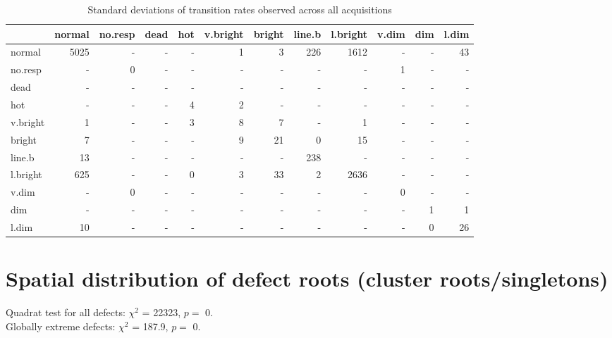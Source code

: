 \documentclass[10pt,fleqn]{article}\usepackage[]{graphicx}\usepackage[]{color}
\begin{document}
\begin{table}[!ht]
\caption{Standard deviations of transition rates observed across all acquisitions}
\begingroup\footnotesize
\begin{tabular}{l|rrrrrrrrrrr}
  \hline
 & normal & no.resp & dead & hot & v.bright & bright & line.b & l.bright & v.dim & dim & l.dim \\ 
  \hline
normal & 5025 & - & - & - & 1 & 3 & 226 & 1612 & - & - & 43 \\ 
  no.resp & - & 0 & - & - & - & - & - & - & 1 & - & - \\ 
  dead & - & - & - & - & - & - & - & - & - & - & - \\ 
  hot & - & - & - & 4 & 2 & - & - & - & - & - & - \\ 
  v.bright & 1 & - & - & 3 & 8 & 7 & - & 1 & - & - & - \\ 
  bright & 7 & - & - & - & 9 & 21 & 0 & 15 & - & - & - \\ 
  line.b & 13 & - & - & - & - & - & 238 & - & - & - & - \\ 
  l.bright & 625 & - & - & 0 & 3 & 33 & 2 & 2636 & - & - & - \\ 
  v.dim & - & 0 & - & - & - & - & - & - & 0 & - & - \\ 
  dim & - & - & - & - & - & - & - & - & - & 1 & 1 \\ 
  l.dim & 10 & - & - & - & - & - & - & - & - & 0 & 26 \\ 
   \hline
\end{tabular}
\endgroup

\end{table}



\FloatBarrier


\section{Spatial distribution of defect roots (cluster roots/singletons)}




Quadrat test for all defects: $\chi^2$ = 22323, $p =$ 0. \\
Globally extreme defects: $\chi^2$ = 187.9, $p = $ 0. 
\end{document}
